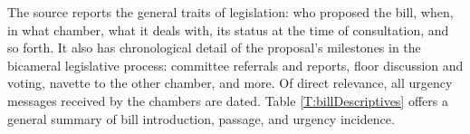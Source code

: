 \documentclass[letter,12pt]{article}
\newcommand{\mc}{\multicolumn}
\begin{document}


The source reports the general traits of legislation: who proposed the bill, when, in what chamber, what it deals with, its status at the time of consultation, and so forth. It also has chronological detail of the proposal's milestones in the bicameral legislative process: committee referrals and reports, floor discussion and voting, navette to the other chamber, and more. Of direct relevance, all urgency messages received by the chambers are dated. Table \ref{T:billDescriptives} offers a general summary of bill introduction, passage, and urgency incidence.
\end{document}
